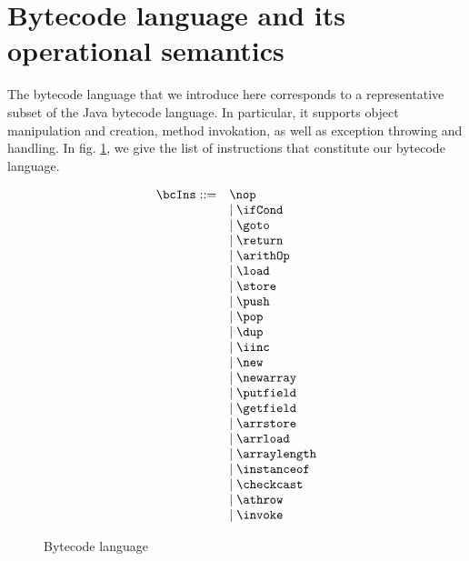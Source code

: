 
\newtheorem{StateTransition}{Definition}[section]
\newtheorem{transClosStateTrans0}[StateTransition]{Definition}
\newtheorem{transClosStateTrans1}[StateTransition]{Definition}



\section{Bytecode language and its operational semantics} \label{opSem}
 The bytecode language that we introduce here corresponds to a representative subset of the Java bytecode language. 
 In particular, it supports object manipulation and creation, method invokation, as well as exception throwing and handling.
 In fig. \ref{opSem:bclang}, we give the list of instructions that constitute our bytecode
 language.
 
\begin{figure}[h] 
\begin{frameit}
      $$  \begin{array}{ll}
             \bcIns ::= & \nop \\
	                & \mid \ifCond \\
	                & \mid \goto  \\ 
			& \mid \return  \\ 
			& \mid \arithOp  \\ 
			& \mid \load \\ 
			& \mid \store \\
			& \mid \push \\
			& \mid \pop \\
			& \mid \dup \\
			& \mid \iinc \\
			& \mid \new \\
			& \mid \newarray   \\ 	
			& \mid \putfield  \\
			& \mid \getfield  \\
			& \mid \arrstore   \\
			& \mid \arrload  \\
			& \mid \arraylength  \\
			& \mid \instanceof  \\
			& \mid \checkcast \\
			& \mid \athrow  \\
			& \mid \invoke  \\
	\end{array}$$
        \caption{\sc Bytecode language}
        \label{opSem:bclang}
\end{frameit}
\end{figure}  
 	 
